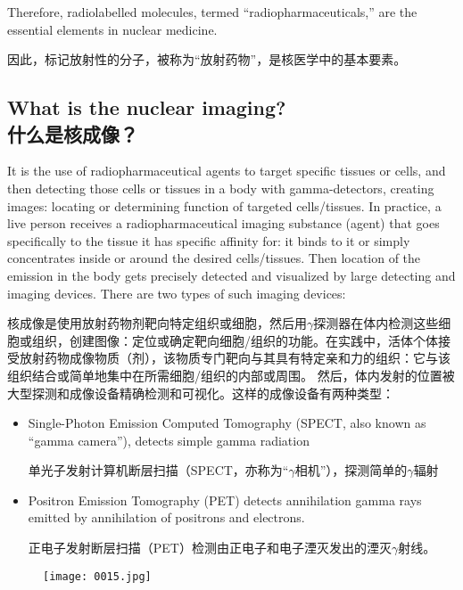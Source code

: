 \documentclass[dvipsnames, svgnames,a4paper,11pt]{article}
\begin{document}
Therefore, radiolabelled molecules, termed “radiopharmaceuticals,” are the essential elements in nuclear medicine.

因此，标记放射性的分子，被称为“放射药物”，是核医学中的基本要素。

\subsection{What is the nuclear imaging?\\什么是核成像？}

It is the use of radiopharmaceutical agents to target specific tissues or cells, and then detecting those cells or tissues in a body with gamma-detectors, creating images: locating or determining function of targeted cells/tissues.
In practice, a live person receives a radiopharmaceutical imaging substance (agent) that goes specifically to the tissue it has specific affinity for: it binds to it or simply concentrates inside or around the desired cells/tissues.  Then location of the emission in the body gets precisely detected and visualized by large detecting and imaging devices. There are two types of such imaging devices:

核成像是使用放射药物剂靶向特定组织或细胞，然后用$\gamma$探测器在体内检测这些细胞或组织，创建图像：定位或确定靶向细胞/组织的功能。在实践中，活体个体接受放射药物成像物质（剂），该物质专门靶向与其具有特定亲和力的组织：它与该组织结合或简单地集中在所需细胞/组织的内部或周围。 然后，体内发射的位置被大型探测和成像设备精确检测和可视化。这样的成像设备有两种类型：

\begin{itemize}
      \item Single-Photon Emission Computed Tomography (SPECT, also known as “gamma camera”), detects simple gamma radiation

            单光子发射计算机断层扫描（SPECT，亦称为“$\gamma$相机”），探测简单的$\gamma$辐射

      \item Positron Emission Tomography (PET) detects annihilation gamma rays emitted by annihilation of positrons and electrons.

            正电子发射断层扫描（PET）检测由正电子和电子湮灭发出的湮灭$\gamma$射线。
\end{itemize}

\begin{figure}[h]
    \centering
    \texttt{[image: 0015.jpg]}
     \label{fig1}
\end{figure}
\end{document}
